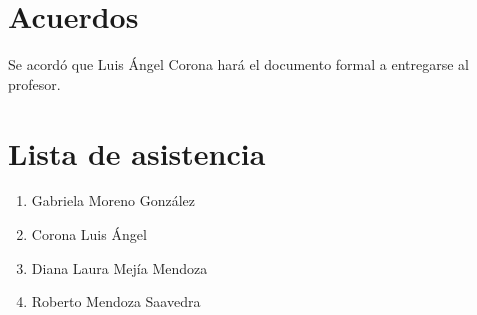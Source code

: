 \documentclass[12pt]{article}
\begin{document}
\section{Acuerdos}
	Se acordó que Luis Ángel Corona hará el documento formal a entregarse al profesor. \\
\section{Lista de asistencia}
\begin{enumerate}
 	 \item  Gabriela Moreno González
	 \item  Corona Luis Ángel
	 \item  Diana Laura Mejía Mendoza
	 \item  Roberto Mendoza Saavedra
\end{enumerate}
\end{document}

